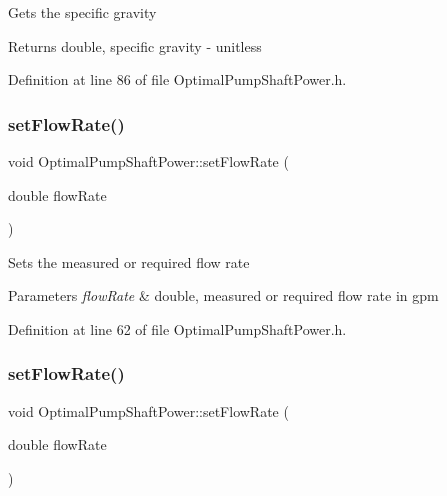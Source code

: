 Gets the specific gravity \begin{DoxyReturn}{Returns}
double, specific gravity -\/ unitless 
\end{DoxyReturn}


Definition at line 86 of file Optimal\+Pump\+Shaft\+Power.\+h.

\mbox{\label{class_optimal_pump_shaft_power_a38efdee39db4c3856915f1ab26d44ed2}} 
\subsubsection{\texorpdfstring{set\+Flow\+Rate()}{setFlowRate()}\hspace{0.1cm}{\footnotesize\ttfamily [1/3]}}
{\footnotesize\ttfamily void Optimal\+Pump\+Shaft\+Power\+::set\+Flow\+Rate (\begin{DoxyParamCaption}\item[{double}]{flow\+Rate }\end{DoxyParamCaption})\hspace{0.3cm}{\ttfamily [inline]}}

Sets the measured or required flow rate 
\begin{DoxyParams}{Parameters}
{\em flow\+Rate} & double, measured or required flow rate in gpm \\
\hline
\end{DoxyParams}


Definition at line 62 of file Optimal\+Pump\+Shaft\+Power.\+h.

\mbox{\label{class_optimal_pump_shaft_power_a38efdee39db4c3856915f1ab26d44ed2}} 
\subsubsection{\texorpdfstring{set\+Flow\+Rate()}{setFlowRate()}\hspace{0.1cm}{\footnotesize\ttfamily [2/3]}}
{\footnotesize\ttfamily void Optimal\+Pump\+Shaft\+Power\+::set\+Flow\+Rate (\begin{DoxyParamCaption}\item[{double}]{flow\+Rate }\end{DoxyParamCaption})\hspace{0.3cm}{\ttfamily [inline]}}

